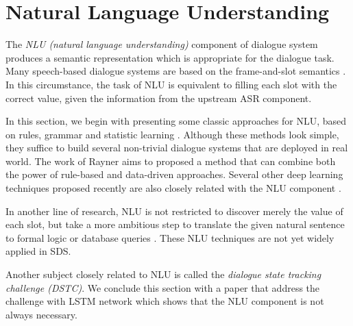 \section{Natural Language Understanding}

The \emph{NLU (natural language understanding)} component of dialogue system produces a semantic representation which is appropriate for the dialogue task. Many speech-based dialogue systems are based on the frame-and-slot semantics \cite{Jurafsky2006}. In this circumstance, the task of NLU is equivalent to filling each slot with the correct value, given the information from the upstream ASR component.

In this section, we begin with presenting some classic approaches for NLU, based on rules, grammar and statistic learning \cite{Miller1996,Pieraccini1994,Ward1994}. Although these methods look simple, they suffice to build several non-trivial dialogue systems that are deployed in real world. The work of Rayner \cite{Rayner2003} aims to proposed a method that can combine both the power of rule-based and data-driven approaches. Several other deep learning techniques proposed recently are also closely related with the NLU component \cite{Hermann2013, Kalchbrenner2013}.

In another line of research, NLU is not restricted to discover merely the value of each slot, but take a more ambitious step to translate the given natural sentence to formal logic or database queries \cite{Grefenstette2014}. These NLU techniques are not yet widely applied in SDS.

Another subject closely related to NLU is called the \emph{dialogue state tracking challenge (DSTC)}. We conclude this section with a paper that address the challenge with LSTM network \cite{Zilka2015} which shows that the NLU component is not always necessary.









